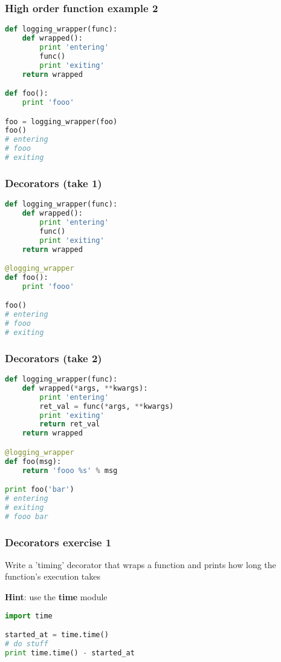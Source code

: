 \documentclass{beamer}
\begin{document}
\begin{frame}[fragile]
\frametitle{High order function example 2}
\begin{lstlisting}[language=python]
def logging_wrapper(func):
    def wrapped():
        print 'entering'
        func()
        print 'exiting'
    return wrapped

def foo():
    print 'fooo'

foo = logging_wrapper(foo)
foo()
# entering
# fooo
# exiting
\end{lstlisting}
\end{frame}


\begin{frame}[fragile]
\frametitle{Decorators (take 1)}
\begin{lstlisting}[language=python]
def logging_wrapper(func):
    def wrapped():
        print 'entering'
        func()
        print 'exiting'
    return wrapped

@logging_wrapper
def foo():
    print 'fooo'

foo()
# entering
# fooo
# exiting
\end{lstlisting}
\end{frame}

\begin{frame}[fragile]
\frametitle{Decorators (take 2)}
\begin{lstlisting}[language=python]
def logging_wrapper(func):
    def wrapped(*args, **kwargs):
        print 'entering'
        ret_val = func(*args, **kwargs)
        print 'exiting'
        return ret_val
    return wrapped

@logging_wrapper
def foo(msg):
    return 'fooo %s' % msg

print foo('bar')
# entering
# exiting
# fooo bar
\end{lstlisting}
\end{frame}

\begin{frame}[fragile]
\frametitle{Decorators exercise 1}
Write a 'timing' decorator that wraps a function and prints how long the function's execution takes

\vspace{15 mm}
{\bf Hint}: use the {\bf time} module
\vspace{5 mm}
\begin{lstlisting}[language=python]
import time

started_at = time.time()
# do stuff
print time.time() - started_at
\end{lstlisting}
\end{frame}
\end{document}
